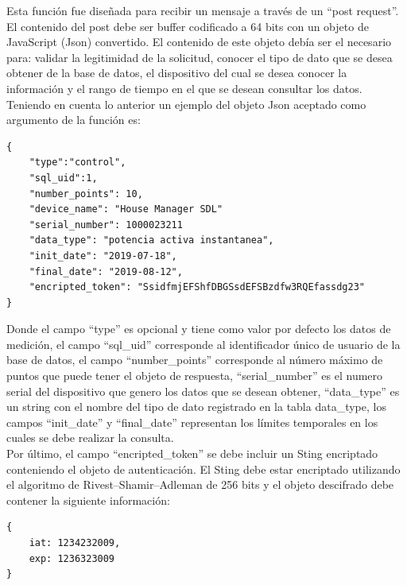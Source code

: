 Esta función fue diseñada para recibir un mensaje a través de un ``post request''. El contenido del post debe ser buffer codificado a 64 bits con un objeto de JavaScript (Json) convertido. El contenido de este objeto debía ser el necesario para: validar la legitimidad de la solicitud, conocer el tipo de dato que se desea obtener de la base de datos, el dispositivo del cual se desea conocer la información y el rango de tiempo en el que se desean consultar los datos. Teniendo en cuenta lo anterior un ejemplo del objeto Json aceptado como argumento de la función es:
\begin{Verbatim}[tabsize=4]
{
	"type":"control",
	"sql_uid":1,
	"number_points": 10,
	"device_name": "House Manager SDL"
	"serial_number": 1000023211
	"data_type": "potencia activa instantanea",
	"init_date": "2019-07-18",
	"final_date": "2019-08-12",
	"encripted_token": "SsidfmjEFShfDBGSsdEFSBzdfw3RQEfassdg23"
}
\end{Verbatim}
Donde  el campo ``type'' es opcional y tiene como valor por defecto los datos de medición, el campo ``sql\_uid'' corresponde al identificador único de usuario de la base de datos, el campo ``number\_points'' corresponde al número máximo de puntos que puede tener el objeto de respuesta, ``serial\_number'' es el numero serial del dispositivo que genero los datos que se desean obtener, ``data\_type'' es un string con el nombre del tipo de dato registrado en la tabla data\_type, los campos ``init\_date'' y ``final\_date'' representan los límites temporales en los cuales se debe realizar la consulta.
\vspace{0.5cm}\\
Por último, el campo ``encripted\_token'' se debe incluir un Sting encriptado conteniendo el objeto de autenticación. El Sting debe estar encriptado utilizando el algoritmo de Rivest–Shamir–Adleman de 256 bits y el objeto descifrado debe contener la siguiente información:

\begin{Verbatim}[tabsize=4]
{
	iat: 1234232009,
	exp: 1236323009
}
\end{Verbatim}


